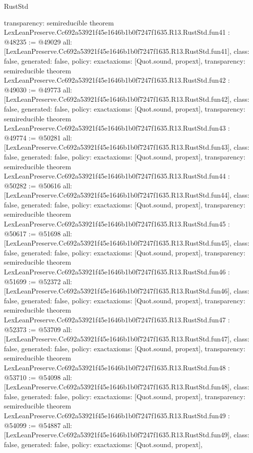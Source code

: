 \begin{lexlean}{RustStd}
\begin{coremodule}
{  transparency: semireducible
}
theorem LexLeanPreserve.Cc692a53921f45e1646b1b0f7247f1635.R13.RustStd.fun41 : @48235 := @49029 {
  all: [LexLeanPreserve.Cc692a53921f45e1646b1b0f7247f1635.R13.RustStd.fun41],
  class: false,
  generated: false,
  policy: exact{axioms: [Quot.sound, propext]},
  transparency: semireducible
}
theorem LexLeanPreserve.Cc692a53921f45e1646b1b0f7247f1635.R13.RustStd.fun42 : @49030 := @49773 {
  all: [LexLeanPreserve.Cc692a53921f45e1646b1b0f7247f1635.R13.RustStd.fun42],
  class: false,
  generated: false,
  policy: exact{axioms: [Quot.sound, propext]},
  transparency: semireducible
}
theorem LexLeanPreserve.Cc692a53921f45e1646b1b0f7247f1635.R13.RustStd.fun43 : @49774 := @50281 {
  all: [LexLeanPreserve.Cc692a53921f45e1646b1b0f7247f1635.R13.RustStd.fun43],
  class: false,
  generated: false,
  policy: exact{axioms: [Quot.sound, propext]},
  transparency: semireducible
}
theorem LexLeanPreserve.Cc692a53921f45e1646b1b0f7247f1635.R13.RustStd.fun44 : @50282 := @50616 {
  all: [LexLeanPreserve.Cc692a53921f45e1646b1b0f7247f1635.R13.RustStd.fun44],
  class: false,
  generated: false,
  policy: exact{axioms: [Quot.sound, propext]},
  transparency: semireducible
}
theorem LexLeanPreserve.Cc692a53921f45e1646b1b0f7247f1635.R13.RustStd.fun45 : @50617 := @51698 {
  all: [LexLeanPreserve.Cc692a53921f45e1646b1b0f7247f1635.R13.RustStd.fun45],
  class: false,
  generated: false,
  policy: exact{axioms: [Quot.sound, propext]},
  transparency: semireducible
}
theorem LexLeanPreserve.Cc692a53921f45e1646b1b0f7247f1635.R13.RustStd.fun46 : @51699 := @52372 {
  all: [LexLeanPreserve.Cc692a53921f45e1646b1b0f7247f1635.R13.RustStd.fun46],
  class: false,
  generated: false,
  policy: exact{axioms: [Quot.sound, propext]},
  transparency: semireducible
}
theorem LexLeanPreserve.Cc692a53921f45e1646b1b0f7247f1635.R13.RustStd.fun47 : @52373 := @53709 {
  all: [LexLeanPreserve.Cc692a53921f45e1646b1b0f7247f1635.R13.RustStd.fun47],
  class: false,
  generated: false,
  policy: exact{axioms: [Quot.sound, propext]},
  transparency: semireducible
}
theorem LexLeanPreserve.Cc692a53921f45e1646b1b0f7247f1635.R13.RustStd.fun48 : @53710 := @54098 {
  all: [LexLeanPreserve.Cc692a53921f45e1646b1b0f7247f1635.R13.RustStd.fun48],
  class: false,
  generated: false,
  policy: exact{axioms: [Quot.sound, propext]},
  transparency: semireducible
}
theorem LexLeanPreserve.Cc692a53921f45e1646b1b0f7247f1635.R13.RustStd.fun49 : @54099 := @54887 {
  all: [LexLeanPreserve.Cc692a53921f45e1646b1b0f7247f1635.R13.RustStd.fun49],
  class: false,
  generated: false,
  policy: exact{axioms: [Quot.sound, propext]},
}
\end{coremodule}
\end{lexlean}
